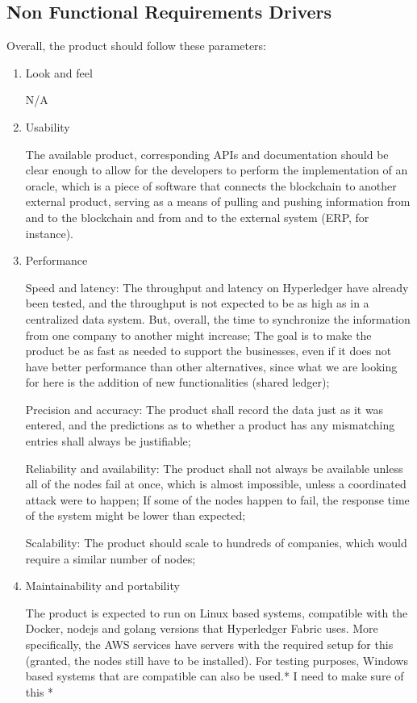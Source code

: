 		

\subsection{Non Functional Requirements Drivers}

Overall, the product should follow these parameters:
\begin{enumerate}
	\item Look and feel
		\par N/A
    \item  Usability
		\par The available product, corresponding APIs  and documentation should be clear enough to allow for the developers to perform the implementation of an oracle, which is a piece of software that connects the blockchain to another external product, serving as a means of pulling and pushing information from and to the blockchain and from and to the external system (ERP, for instance).
    \item  Performance
		\par Speed and latency: The throughput and latency on Hyperledger have already been tested, and the throughput is not expected to be as high as in a centralized data system. But, overall, the time to synchronize the information from one company to another might increase; The goal is to make the product be as fast as needed to support the businesses, even if it does not have better performance than other alternatives, since what we are looking for here is the addition of new functionalities (shared ledger);
		\par Precision and accuracy: The product shall record the data just as it was entered, and the predictions as to whether a product has any mismatching entries shall always be justifiable;
		\par Reliability and availability: The product shall not always be available unless all of the nodes fail at once, which is almost impossible, unless a coordinated attack were to happen; If some of the nodes happen to fail, the response time of the system might be lower than expected;
		\par Scalability: The product should scale to hundreds of companies, which would require a similar number of nodes;
    \item  Maintainability and portability
		\par The product is expected to run on Linux based systems, compatible with the Docker, nodejs and golang versions that Hyperledger Fabric uses. More specifically, the AWS services have servers with the required setup for this (granted, the nodes still have to be installed). For testing purposes, Windows based systems that are compatible can also be used.* I need to make sure of this *

\end{enumerate}
